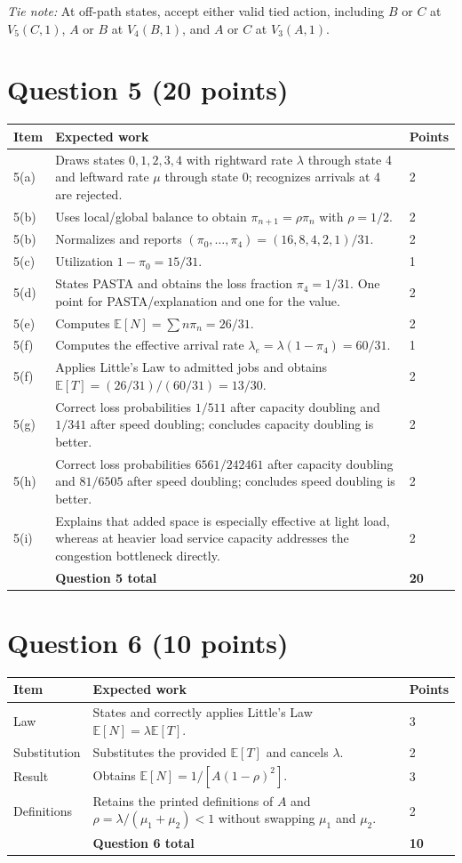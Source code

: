 \documentclass[11pt,letterpaper]{article}
\newcommand{\E}{\mathbb{E}}
\newcommand{\rubricsection}[2]{%
  \section*{\color{hkustblue}Question #1 \normalfont\normalsize (#2 points)}
}
\begin{document}
\textit{Tie note:} At off-path states, accept either valid tied action, including
$B$ or $C$ at $V_5(C,1)$, $A$ or $B$ at $V_4(B,1)$, and $A$ or $C$ at
$V_3(A,1)$.

\rubricsection{5}{20}

\begin{longtable}{L{0.12\textwidth}L{0.72\textwidth}C{0.08\textwidth}}
\toprule
Item & Expected work & Points \\
(a) & Draws states $0,1,2,3,4$ with rightward rate $\lambda$ through state 4 and
leftward rate $\mu$ through state 0; recognizes arrivals at 4 are rejected. & 2\\
5(b) & Uses local/global balance to obtain $\pi_{n+1}=\rho\pi_n$ with
$\rho=1/2$. & 2\\
5(b) & Normalizes and reports
$(\pi_0,\ldots,\pi_4)=(16,8,4,2,1)/31$. & 2\\
5(c) & Utilization $1-\pi_0=15/31$. & 1\\
5(d) & States PASTA and obtains the loss fraction $\pi_4=1/31$.  One point for
PASTA/explanation and one for the value. & 2\\
5(e) & Computes $\E[N]=\sum n\pi_n=26/31$. & 2\\
5(f) & Computes the effective arrival rate
$\lambda_e=\lambda(1-\pi_4)=60/31$. & 1\\
5(f) & Applies Little's Law to admitted jobs and obtains
$\E[T]=(26/31)/(60/31)=13/30$. & 2\\
5(g) & Correct loss probabilities $1/511$ after capacity doubling and $1/341$
after speed doubling; concludes capacity doubling is better. & 2\\
5(h) & Correct loss probabilities $6561/242461$ after capacity doubling and
$81/6505$ after speed doubling; concludes speed doubling is better. & 2\\
5(i) & Explains that added space is especially effective at light load, whereas at
heavier load service capacity addresses the congestion bottleneck directly. & 2\\
\midrule
& \textbf{Question 5 total} & \textbf{20}\\
\bottomrule
\end{longtable}

\rubricsection{6}{10}

\begin{longtable}{L{0.12\textwidth}L{0.72\textwidth}C{0.08\textwidth}}
\toprule
Item & Expected work & Points \\
\midrule
Law & States and correctly applies Little's Law $\E[N]=\lambda\E[T]$. & 3\\
Substitution & Substitutes the provided $\E[T]$ and cancels $\lambda$. & 2\\
Result & Obtains $\E[N]=1/[A(1-\rho)^2]$. & 3\\
Definitions & Retains the printed definitions of $A$ and
$\rho=\lambda/(\mu_1+\mu_2)<1$ without swapping $\mu_1$ and $\mu_2$. & 2\\
\midrule
& \textbf{Question 6 total} & \textbf{10}\\
\bottomrule
\end{longtable}
\end{document}

